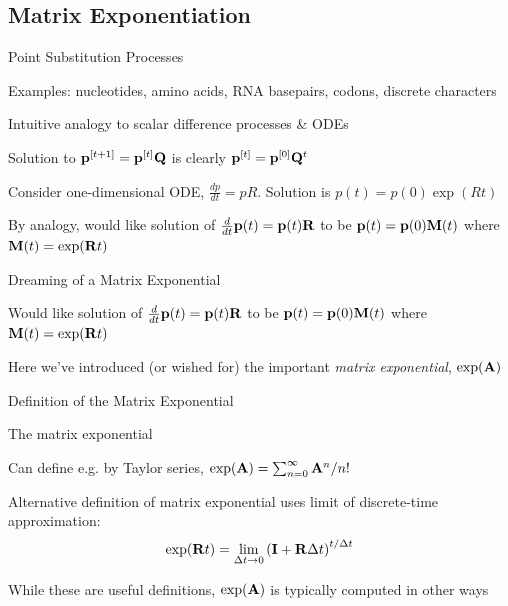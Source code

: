 \documentclass{beamer}
\begin{document}
\subsection{Matrix Exponentiation}

\begin{frame}{Point Substitution Processes}

\itemb
\item Examples: nucleotides, amino acids, RNA basepairs, codons, discrete characters
%
\item Intuitive analogy to scalar difference processes \& ODEs
 \itemb
 \item Solution to ${\bf p}^{[t+1]} = {\bf p}^{[t]} {\bf Q}$ is clearly ${\bf p}^{[t]} = {\bf p}^{[0]} {\bf Q}^t$
\pause
\pause
 \item Consider one-dimensional ODE, $\frac{dp}{dt} = pR$. Solution is $p(t) = p(0) \exp(Rt)$
\pause
 \item By analogy, would like solution of $\frac{d}{dt} {\bf p}(t) = {\bf p}(t) {\bf R}$ to be ${\bf p}(t) = {\bf p}(0){\bf M}(t)$ where ${\bf M}(t) = \exp({\bf R}t)$
 \iteme
\iteme

\end{frame}


\begin{frame}{Dreaming of a Matrix Exponential}

\itemb
\item Would like solution of $\frac{d}{dt} {\bf p}(t) = {\bf p}(t) {\bf R}$ to be ${\bf p}(t) = {\bf p}(0){\bf M}(t)$ where ${\bf M}(t) = \exp({\bf R}t)$
\item Here we've introduced (or wished for) the important {\em matrix exponential}, $\exp({\bf A})$
\iteme

\end{frame}

\begin{frame}{Definition of the Matrix Exponential}

\itemb
\item The \alert{matrix exponential}
 \itemb
 \item Can define e.g. by Taylor series, $\exp({\bf A}) = \sum_{n=0}^\infty {\bf A}^n / n!$
\pause
 \item Alternative definition of matrix exponential uses limit of discrete-time approximation:
\[
\exp({\bf R}t) = \lim_{\Delta t \to 0} \left( {\bf I} + {\bf R} \Delta t \right)^{t/\Delta t}
\]
\pause
 \item While these are useful definitions, $\exp({\bf A})$ is typically computed in other ways
 \iteme
\iteme

\end{frame}
\end{document}
